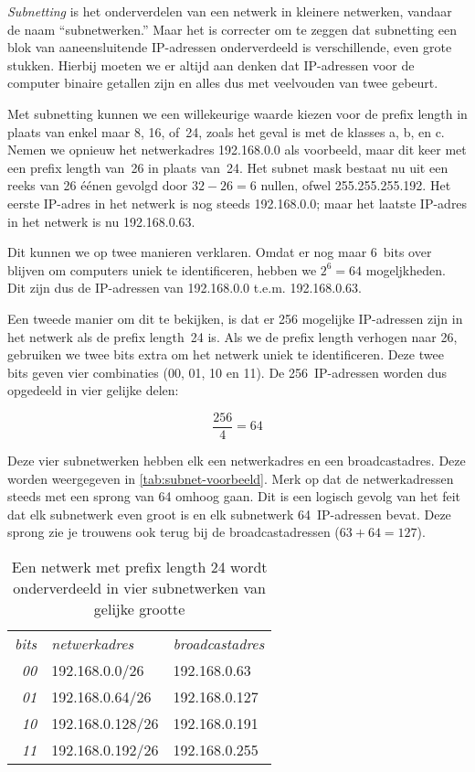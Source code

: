 \emph{Subnetting} is het onderverdelen van een netwerk in kleinere netwerken, vandaar de naam ``subnetwerken.''
Maar het is correcter om te zeggen dat subnetting een blok van aaneensluitende IP-adressen onderverdeeld is verschillende, even grote stukken.
Hierbij moeten we er altijd aan denken dat IP-adressen voor de computer binaire getallen zijn en alles dus met veelvouden van twee gebeurt.

Met subnetting kunnen we een willekeurige waarde kiezen voor de prefix length in plaats van enkel maar 8, 16, of~24, zoals het geval is met de klasses a, b, en c.
Nemen we opnieuw het netwerkadres 192.168.0.0 als voorbeeld, maar dit keer met een prefix length van~26 in plaats van~24.
Het subnet mask bestaat nu uit een reeks van 26 éénen gevolgd door $32-26=6$ nullen, ofwel 255.255.255.192.
Het eerste IP-adres in het netwerk is nog steeds 192.168.0.0;
maar het laatste IP-adres in het netwerk is nu 192.168.0.63.

Dit kunnen we op twee manieren verklaren.
Omdat er nog maar 6~bits over blijven om computers uniek te identificeren, hebben we $2^6=64$ mogeljkheden.
Dit zijn dus de IP-adressen van 192.168.0.0 t.e.m. 192.168.0.63.

Een tweede manier om dit te bekijken, is dat er 256 mogelijke IP-adressen zijn in het netwerk als de prefix length~24 is.
Als we de prefix length verhogen naar 26, gebruiken we twee bits extra om het netwerk uniek te identificeren.
Deze twee bits geven vier combinaties (00, 01, 10 en 11).
De 256~IP-adressen worden dus opgedeeld in vier gelijke delen:

\[\frac{256}{4} = 64\]

Deze vier subnetwerken hebben elk een netwerkadres en een broadcastadres.
Deze worden weergegeven in \vref{tab:subnet-voorbeeld}.
Merk op dat de netwerkadressen steeds met een sprong van 64 omhoog gaan.
Dit is een logisch gevolg van het feit dat elk subnetwerk even groot is en elk subnetwerk 64~IP-adressen bevat.
Deze sprong zie je trouwens ook terug bij de broadcastadressen ($63 + 64 = 127$).

\begin{table}[htp]
   \centering
   \begin{tabular}{rll}
   \textit{bits} & \textit{netwerkadres}     & \textit{broadcastadres} \\[1ex]
   \textit{00}   & 192.168.0.0/26   & 192.168.0.63   \\
   \textit{01}   & 192.168.0.64/26  & 192.168.0.127  \\
   \textit{10}   & 192.168.0.128/26 & 192.168.0.191  \\
   \textit{11}   & 192.168.0.192/26 & 192.168.0.255  \\
   \end{tabular}
   \caption{Een netwerk met prefix length 24 wordt onderverdeeld in vier subnetwerken van gelijke grootte}
   \label{tab:subnet-voorbeeld}
\end{table}

